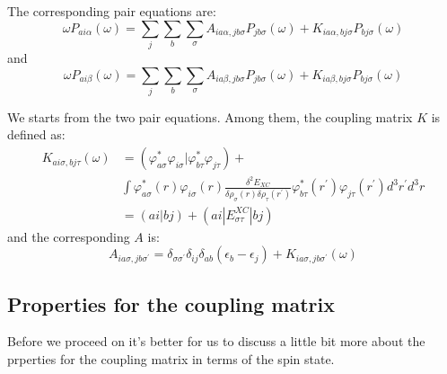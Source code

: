 The corresponding pair equations are:
\begin{equation}
 \label{TDDFT_singlet_triplet:3}
\omega P_{ai\alpha} (\omega)  = 
\sum_{j}\sum_{b}\sum_{\sigma}A_{ia\alpha, jb\sigma}
P_{jb\sigma}(\omega) + K_{ia\alpha, bj\sigma}
P_{bj\sigma}(\omega)
\end{equation} 
and 
\begin{equation}
 \label{TDDFT_singlet_triplet:4}
\omega P_{ai\beta} (\omega)  = 
\sum_{j}\sum_{b}\sum_{\sigma}A_{ia\beta, jb\sigma}
P_{jb\sigma}(\omega) + K_{ia\beta, bj\sigma}
P_{bj\sigma}(\omega)
\end{equation} 

We starts from the two pair equations. Among them, the 
coupling matrix $K$ is defined as:
\begin{align}
\label{TDDFT_singlet_triplet:5}
 K_{ai\sigma, bj\tau}(\omega) &=
(\varphi^{*}_{a\sigma}\varphi_{i\sigma}|\varphi^{*}_{b\tau}\varphi_{
j\tau}) + \nonumber \\
&\int
\varphi^{*}_{a\sigma}(r)\varphi_{i\sigma}(r)  
\frac{\delta^{2} E_{XC}}
{\delta \rho_{\sigma} (r)\delta \rho_{\tau} (r^{'})}
\varphi^{*}_{b\tau}(r^{'})\varphi_{j\tau}(r^{'})
d^{3}r^{'}d^{3}r \nonumber \\
&=(ai|bj) + (ai|E^{XC}_{\sigma\tau}|bj)      
\end{align}
and the corresponding $A$ is:
\begin{equation}
\label{TDDFT_singlet_triplet:6}
 A_{ia\sigma, jb\sigma^{'}} 
=\delta_{\sigma\sigma^{'}}\delta_{ij}\delta_{ab}(\epsilon_{b} -
\epsilon_{j}) + K_{ia\sigma, jb\sigma^{'}}(\omega)
\end{equation}  

\subsection{Properties for the coupling matrix}
%
%
%
%
Before we proceed on it's better for us to discuss a little bit more
about the prperties for the coupling matrix in terms of the spin
state.

